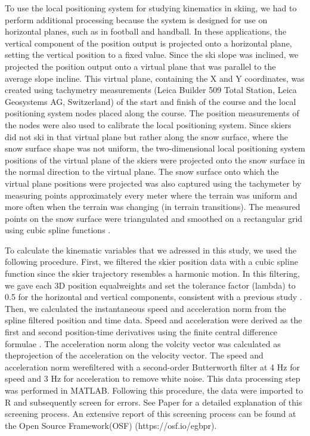 To use the local positioning system for studying kinematics in skiing, we had to perform additional processing because the system is designed for use on horizontal planes, such as in football and handball. In these applications, the vertical component of the position output is projected onto a horizontal plane, setting the vertical position to a fixed value. Since the ski slope was inclined, we projected the position output onto a virtual plane that was parallel to the average slope incline. This virtual plane, containing the X and Y coordinates, was created using tachymetry measurements (Leica Builder 509 Total Station, Leica Geosystems AG, Switzerland) of the start and finish of the course and the local positioning system nodes placed along the course. The position measurements of the nodes were also used to calibrate the local positioning system.  Since skiers did not ski in that virtual plane but rather along the snow surface, where the snow surface shape was not uniform, the two-dimensional local positioning system positions of the virtual plane of the skiers were projected onto the snow surface in the normal direction to the virtual plane. The snow surface onto which the virtual plane positions were projected was also captured using the tachymeter by measuring points approximately every meter where the terrain was uniform and more often when the terrain was changing (in terrain transitions). The measured points on the snow surface were triangulated and smoothed on a rectangular grid using cubic spline functions  \cite{gilgien_determination_2013}. 

To calculate the kinematic variables that we adressed in this study, we used the following procedure. First, we filtered the skier position data with a cubic spline function since the skier trajectory resembles a harmonic motion. In this filtering, we gave each 3D position equalweights and set the tolerance factor (lambda) to 0.5 for the horizontal and vertical components, consistent with a previous study \cite{gilgien_determination_2013}. Then, we calculated the instantaneous speed and acceleration norm from the spline filtered position and time data. Speed and acceleration were derived as the first and second position-time derivatives using the finite central difference formulae \cite{gilat_numerical_2013}. The acceleration norm along the volcity vector was calculated as theprojection of the acceleration on the velocity vector. The speed and acceleration norm werefiltered with a second-order Butterworth filter at 4 Hz for speed and 3 Hz for acceleration to remove white noise. This data processing step was performed in MATLAB. Following this procedure, the data were imported to R and subsequently screen for errors. See Paper  for a detailed explanation of this screening process. An extensive report of this screening process can be found at the Open Source Framework(OSF) (https://osf.io/egbpr). 

